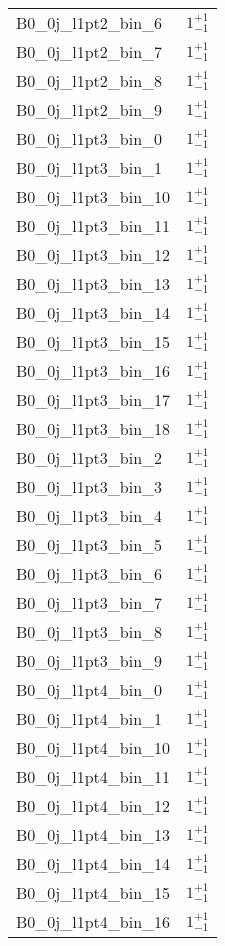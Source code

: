 \begin{tabular}{|l|c|}
B0\_0j\_l1pt2\_bin\_6 & $1^{+1}_{-1}$ \\
B0\_0j\_l1pt2\_bin\_7 & $1^{+1}_{-1}$ \\
B0\_0j\_l1pt2\_bin\_8 & $1^{+1}_{-1}$ \\
B0\_0j\_l1pt2\_bin\_9 & $1^{+1}_{-1}$ \\
B0\_0j\_l1pt3\_bin\_0 & $1^{+1}_{-1}$ \\
B0\_0j\_l1pt3\_bin\_1 & $1^{+1}_{-1}$ \\
B0\_0j\_l1pt3\_bin\_10 & $1^{+1}_{-1}$ \\
B0\_0j\_l1pt3\_bin\_11 & $1^{+1}_{-1}$ \\
B0\_0j\_l1pt3\_bin\_12 & $1^{+1}_{-1}$ \\
B0\_0j\_l1pt3\_bin\_13 & $1^{+1}_{-1}$ \\
B0\_0j\_l1pt3\_bin\_14 & $1^{+1}_{-1}$ \\
B0\_0j\_l1pt3\_bin\_15 & $1^{+1}_{-1}$ \\
B0\_0j\_l1pt3\_bin\_16 & $1^{+1}_{-1}$ \\
B0\_0j\_l1pt3\_bin\_17 & $1^{+1}_{-1}$ \\
B0\_0j\_l1pt3\_bin\_18 & $1^{+1}_{-1}$ \\
B0\_0j\_l1pt3\_bin\_2 & $1^{+1}_{-1}$ \\
B0\_0j\_l1pt3\_bin\_3 & $1^{+1}_{-1}$ \\
B0\_0j\_l1pt3\_bin\_4 & $1^{+1}_{-1}$ \\
B0\_0j\_l1pt3\_bin\_5 & $1^{+1}_{-1}$ \\
B0\_0j\_l1pt3\_bin\_6 & $1^{+1}_{-1}$ \\
B0\_0j\_l1pt3\_bin\_7 & $1^{+1}_{-1}$ \\
B0\_0j\_l1pt3\_bin\_8 & $1^{+1}_{-1}$ \\
B0\_0j\_l1pt3\_bin\_9 & $1^{+1}_{-1}$ \\
B0\_0j\_l1pt4\_bin\_0 & $1^{+1}_{-1}$ \\
B0\_0j\_l1pt4\_bin\_1 & $1^{+1}_{-1}$ \\
B0\_0j\_l1pt4\_bin\_10 & $1^{+1}_{-1}$ \\
B0\_0j\_l1pt4\_bin\_11 & $1^{+1}_{-1}$ \\
B0\_0j\_l1pt4\_bin\_12 & $1^{+1}_{-1}$ \\
B0\_0j\_l1pt4\_bin\_13 & $1^{+1}_{-1}$ \\
B0\_0j\_l1pt4\_bin\_14 & $1^{+1}_{-1}$ \\
B0\_0j\_l1pt4\_bin\_15 & $1^{+1}_{-1}$ \\
B0\_0j\_l1pt4\_bin\_16 & $1^{+1}_{-1}$ \\

\end{tabular}
